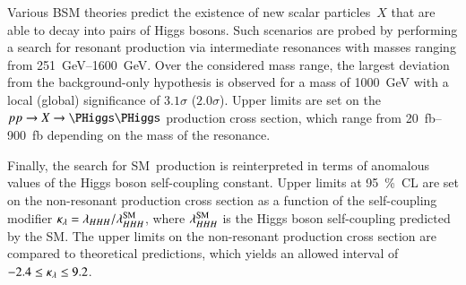 Various BSM theories predict the existence of new scalar particles~$X$ that are
able to decay into pairs of Higgs bosons. Such scenarios are probed by
performing a search for resonant \HH production via intermediate resonances with
masses ranging from \SIrange{251}{1600}{\GeV}. Over the considered mass range,
the largest deviation from the background-only hypothesis is observed for a mass
of \SI{1000}{\GeV} with a local (global) significance of $3.1\sigma$
($2.0\sigma$). Upper limits are set on the $\pp \to X \to \HH$ production cross
section, which range from \SIrange{20}{900}{\femto\barn} depending on the mass
of the resonance.

Finally, the search for SM~\HH production is reinterpreted in terms of anomalous
values of the Higgs boson self-coupling constant. Upper limits at
\SI{95}{\percent}~CL are set on the non-resonant \HH production cross section as
a function of the self-coupling modifier
$\kappa_{\lambda} = \lambda_{HHH} / \lambda_{HHH}^{\text{SM}}$, where $\lambda_{HHH}^{\text{SM}}$
is the Higgs boson self-coupling predicted by the SM. The upper limits on the
non-resonant \HH production cross section are compared to theoretical
predictions, which yields an allowed \klambda interval of
$\num{-2.4} \leq \kappa_{\lambda} \leq 9.2$.

%


